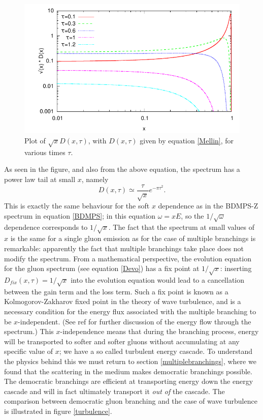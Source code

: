 \documentclass[a4paper,12pt]{article}
\numberwithin{equation}{section}
\begin{document}
\begin{figure}
  \includegraphics[width=0.9\linewidth]{plotD.pdf}
  \vspace*{-20pt}
  \caption{Plot of $\sqrt{x}D(x,\tau)$, with $D(x,\tau)$ given by equation \eqref{Mellin}, for various times $\tau$.}\label{Dfig}
\end{figure}




As seen in the figure, and also from the above equation, the spectrum has a power law tail at small $x$, namely
\begin{equation}\label{softD}
D(x,\tau)\simeq \frac{\tau}{\sqrt{x}}e^{-\pi\tau^2}.
\end{equation}
This is exactly the same behaviour for the soft $x$ dependence as in the BDMPS-Z spectrum in equation \ref{BDMPS}; in this equation $\omega=xE$, so the $1/\sqrt{\omega}$ dependence corresponds to $1/\sqrt{x}$. The fact that the spectrum at small values of $x$ is the same for a single gluon emission as for the case of multiple branchings is remarkable: apparently the fact that multiple branchings take place does not modify the spectrum. From a mathematical perspective, the evolution equation for the gluon spectrum (see equation \eqref{Devo}) has a fix point at $1/\sqrt{x}$: inserting $D_{fix}(x,\tau)=1/\sqrt{x}$ into the evolution equation would lead to a cancellation between the gain term and the loss term\cite{FisterIancu}. 
Such a fix point is known as a Kolmogorov-Zakharov fixed point in the theory of wave turbulence, and is a necessary condition for the energy flux associated with the multiple branching to be $x$-independent. (See ref \cite{FisterIancu} for further discussion of the energy flow through the spectrum.) This $x$-independence means that during the branching process, energy will be transported to softer and softer gluons without accumulating at any specific value of $x$; we have a so called turbulent energy cascade. To understand the physics behind this we must return to section \ref{multiplebranchings}, where we found that the scattering in the medium makes democratic branchings possible. The democratic branchings are efficient at transporting energy down the energy cascade and will in fact ultimately transport it \emph{out of} the cascade. The comparison between democratic gluon branching and the case of wave turbulence is illustrated in figure \ref{turbulence}.
\end{document}
